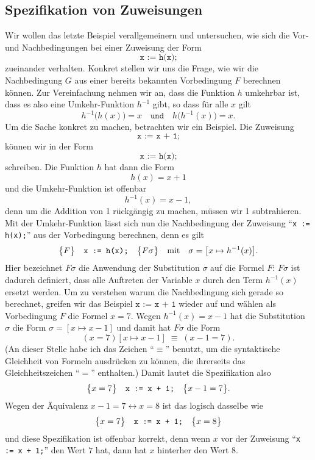 \subsection{Spezifikation von Zuweisungen}
Wir wollen das letzte Beispiel verallgemeinern und untersuchen, wie sich die Vor- und
Nachbedingungen bei einer Zuweisung der Form 
\[ \texttt{x := h(x);} \]
zueinander verhalten.  Konkret stellen wir uns die Frage, wie wir die Nachbedingung $G$
aus einer bereits bekannten Vorbedingung $F$ berechnen k\"onnen.  Zur Vereinfachung nehmen
wir an, dass die Funktion $h$ umkehrbar ist, dass es also eine Umkehr-Funktion $h^{-1}$ gibt,
so dass f\"ur alle $x$ gilt 
\[ h^{-1}\bigl(h(x)\bigr) = x \quad \mathtt{und} \quad h\bigl(h^{-1}(x)\bigr) = x. \]
Um die Sache konkret zu machen, betrachten wir ein Beispiel.  Die Zuweisung 
\[ \texttt{x := x + 1;} \]
k\"onnen wir in der Form 
\[ \texttt{x := h(x);} \]
schreiben. Die Funktion $h$ hat dann die Form 
\[ h(x) = x + 1 \]
und die Umkehr-Funktion  ist offenbar 
\[ h^{-1}(x) = x - 1, \]
denn um die Addition von 1 r\"uckg\"angig zu machen, m\"ussen wir 1 subtrahieren.
Mit der Umkehr-Funktion l\"asst sich nun die Nachbedingung der Zuweisung ``\texttt{x := h(x);}'' aus der
Vorbedingung berechnen, denn es gilt
\[ \bigl\{F\bigr\}\quad\texttt{x := h(x);}\quad\bigl\{F\sigma\bigr\} \quad \mathrm{mit} \quad \sigma = \bigl[x \mapsto h^{-1}(x)\bigr]. \]
Hier bezeichnet $F\sigma$ die Anwendung der Substitution
$\sigma$ auf die Formel $F$: $F\sigma$ ist
dadurch definiert, dass alle Auftreten der Variable $x$ durch den Term $h^{-1}(x)$ ersetzt
werden.  Um zu verstehen warum die Nachbedingung sich gerade so berechnet, greifen wir das
Beispiel $\texttt{x := x + 1}$ wieder auf und w\"ahlen als Vorbedingung $F$ die Formel 
$x = 7$.  Wegen $h^{-1}(x) = x - 1$ hat die Substitution $\sigma$ die Form
$\sigma = [ x \mapsto x - 1 ]$ und damit hat $F\sigma$ die Form 
\[ (x = 7)[x \mapsto x - 1] \;\equiv\; (x - 1 = 7). \]
(An dieser Stelle habe ich das Zeichen ``$\equiv$'' benutzt, um die syntaktische Gleichheit
von Formeln ausdr\"ucken zu k\"onnen, die ihrerseits das Gleichheitszeichen ``$=$''
enthalten.)  Damit lautet die Spezifikation also 
\[ \bigl\{x = 7\bigr\}\quad\texttt{x := x + 1;}\quad\bigl\{x - 1 = 7\bigr\}. \]
Wegen der \"Aquivalenz $x - 1 = 7 \leftrightarrow x = 8$ ist das logisch dasselbe wie
\[ \bigl\{x = 7\bigr\}\quad\texttt{x := x + 1;}\quad\bigl\{x = 8\bigr\} \]
und diese Spezifikation ist offenbar korrekt, denn wenn $x$ vor der Zuweisung
``\texttt{x := x + 1;}'' den Wert $7$ hat, dann hat $x$ hinterher den Wert 8.

